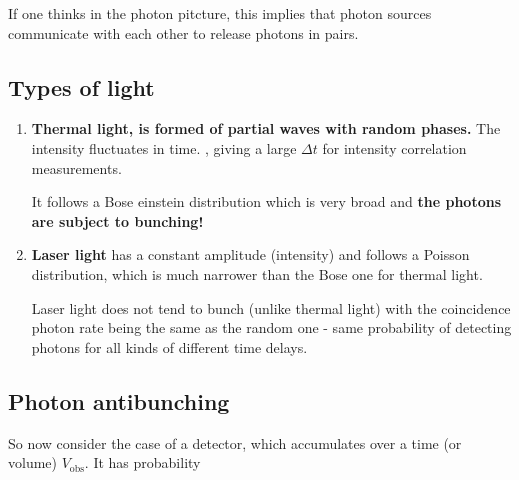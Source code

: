   
  If one thinks in the photon pitcture, this implies that photon sources communicate with each other to release photons in pairs. 

 \subsection{Types of light}
  \begin{enumerate}
  	\item   \textbf{Thermal light, is formed of partial waves with random phases.} The intensity fluctuates in time. , giving a large $ \Delta t $ for intensity correlation measurements.
  	
  	It follows a Bose einstein distribution which is very broad and \textbf{the photons are subject to bunching!}
  	
  	\item \textbf{Laser light} has a constant amplitude (intensity) and follows a Poisson distribution, which is much narrower than the Bose one for thermal light.
  	
  	
  	Laser light does not tend to bunch (unlike thermal light) with the coincidence photon rate being the same as the random one - same probability of detecting photons for all kinds of different time delays.
  \end{enumerate}

 \subsection{Photon antibunching}
  So now consider the case of a detector, which accumulates over a time (or volume) $ V_\text{obs} $. It has probability
  
